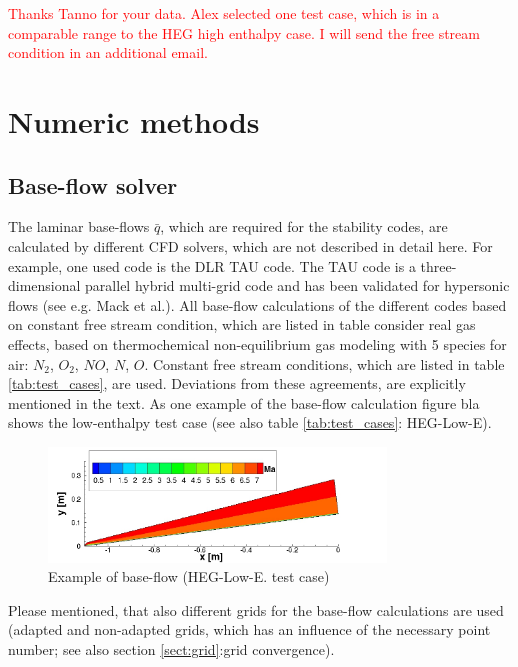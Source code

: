 \documentclass[]{aiaa-tc}%
\begin{document}
\textcolor{red}{Thanks Tanno for your data. Alex selected one test case, which is in a comparable range to the HEG high enthalpy case. I will send the free stream condition in an additional email.}

\section{Numeric methods}
\subsection{Base-flow solver}
The laminar base-flows $\bar{q}$, which are required for the stability codes, are calculated by different CFD solvers, which are not described in detail here. For example, one used code is the DLR TAU code. The TAU code is a three-dimensional parallel hybrid multi-grid code and has been validated for hypersonic flows (see e.g. Mack et al.\cite{Mack_2002}). All base-flow calculations of the different codes based on constant free stream condition, which are listed in table consider real gas effects, based on thermochemical non-equilibrium gas modeling with 5 species for air: $N_2$, $O_2$, $NO$, $N$, $O$. Constant free stream conditions, which are listed in table \ref{tab:test_cases}, are used. Deviations from these agreements,  are explicitly mentioned in the text. As one example of the base-flow calculation figure bla shows the low-enthalpy test case (see also table \ref{tab:test_cases}: HEG-Low-E). 

\begin{figure}[htbp]
	\centering
\includegraphics[width=0.8\textwidth]{pics/heg_low_e_base_flow.jpg}
	\caption{Example of base-flow (HEG-Low-E. test case)}
	\label{fig:cone_model}
\end{figure}

Please mentioned, that also different grids for the base-flow calculations are used (adapted and non-adapted grids, which has an influence of the necessary point number; see also section \ref{sect:grid}:grid convergence).
\end{document}
